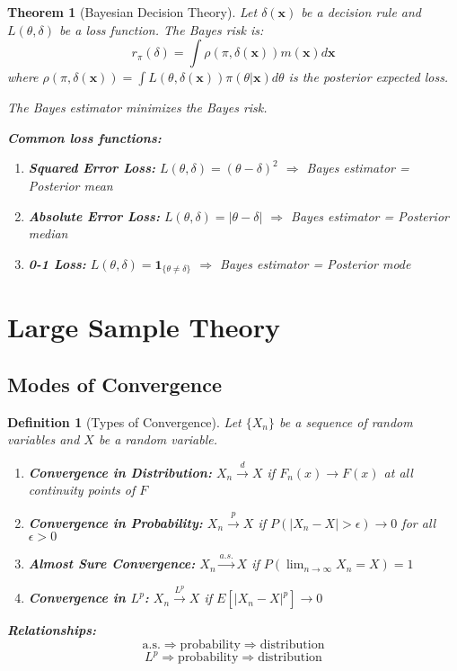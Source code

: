 \documentclass[12pt,a4paper]{article}
\newtheorem{theorem}{Theorem}[section]
\newtheorem{definition}{Definition}[section]
\theoremstyle{remark}
\begin{document}
\begin{theorem}[Bayesian Decision Theory]
Let $\delta(\mathbf{x})$ be a decision rule and $L(\theta, \delta)$ be a loss function. The Bayes risk is:
$$r_\pi(\delta) = \int \rho(\pi, \delta(\mathbf{x})) m(\mathbf{x}) d\mathbf{x}$$
where $\rho(\pi, \delta(\mathbf{x})) = \int L(\theta, \delta(\mathbf{x})) \pi(\theta | \mathbf{x}) d\theta$ is the posterior expected loss.

The Bayes estimator minimizes the Bayes risk.

\textbf{Common loss functions:}
\begin{enumerate}
\item \textbf{Squared Error Loss:} $L(\theta, \delta) = (\theta - \delta)^2$ $\Rightarrow$ Bayes estimator = Posterior mean
\item \textbf{Absolute Error Loss:} $L(\theta, \delta) = |\theta - \delta|$ $\Rightarrow$ Bayes estimator = Posterior median
\item \textbf{0-1 Loss:} $L(\theta, \delta) = \mathbf{1}_{\{\theta \neq \delta\}}$ $\Rightarrow$ Bayes estimator = Posterior mode
\end{enumerate}
\end{theorem}

\section{Large Sample Theory}

\subsection{Modes of Convergence}

\begin{definition}[Types of Convergence]
Let $\{X_n\}$ be a sequence of random variables and $X$ be a random variable.

\begin{enumerate}
\item \textbf{Convergence in Distribution:} $X_n \stackrel{d}{\to} X$ if $F_n(x) \to F(x)$ at all continuity points of $F$
\item \textbf{Convergence in Probability:} $X_n \stackrel{p}{\to} X$ if $P(|X_n - X| > \epsilon) \to 0$ for all $\epsilon > 0$
\item \textbf{Almost Sure Convergence:} $X_n \stackrel{a.s.}{\to} X$ if $P(\lim_{n \to \infty} X_n = X) = 1$
\item \textbf{Convergence in $L^p$:} $X_n \stackrel{L^p}{\to} X$ if $E[|X_n - X|^p] \to 0$
\end{enumerate}

\textbf{Relationships:}
$$\text{a.s.} \Rightarrow \text{probability} \Rightarrow \text{distribution}$$
$$L^p \Rightarrow \text{probability} \Rightarrow \text{distribution}$$
\end{definition}
\end{document}

